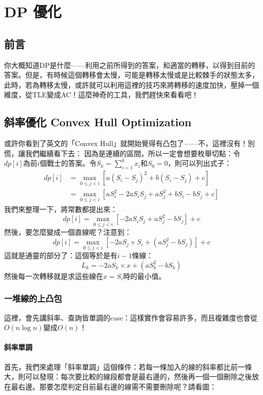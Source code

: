 \chapter{DP 優化}
	\section{前言}
		你大概知道DP是什麼——利用之前所得到的答案，和適當的轉移，以得到目前的答案。但是，有時候這個轉移會太慢，可能是轉移太慢或是比較棘手的狀態太多，此時，若為轉移太慢，或許就可以利用這裡的技巧來將轉移的速度加快，壓掉一個維度，從TLE變成AC！這麼神奇的工具，我們趕快來看看吧！
	\section{斜率優化 Convex Hull Optimization}
		或許你看到了英文的「Convex Hull」就開始覺得有凸包了——不，這裡沒有！別慌，讓我們繼續看下去：
		因為是連續的區間，所以一定會想要枚舉切點：令$dp[i]$為前$i$個戰士的答案。令$S_k = \sum^{k}_{i =1 } x_i$和$S_0 = 0$，則可以列出式子：
		\begin{align*}
			dp[i] &= \max_{0 \leq j < i}[a(S_i - S_{j})^2 + b(S_i - S_{j}) + c]\\
			&= \max_{0 \leq j < i}[aS_i^2 - 2aS_iS_j  + aS_j^2 + bS_i - bS_j + c]
		\end{align*}
		我們來整理一下，將常數都提出來：
		$$dp[i] = \max_{0 \leq j < i}[ - 2aS_iS_j  + aS_j^2  - bS_j] + c$$
		然後，要怎麼變成一個直線呢？注意到：
		$$dp[i] = \max_{0 \leq j < i}[ - 2aS_j \times S_i  + (aS_j^2  - bS_j)] + c$$
		這就是通靈的部分了：這個等於是有$i - 1$條線：
		$$L_k = -2aS_k\times x + (aS_k^2 - bS_k)$$
		然後每一次轉移就是求這些線在$x = S_i$時的最小值。
	\subsection{一堆線的上凸包}
		這裡，會先講斜率、查詢皆單調的case：這樣實作會容易許多，而且複雜度也會從$O(n \log n)$變成$O(n)$！
		\subsubsection{斜率單調}
			首先，我們來處理「斜率單調」這個條件：若每一條加入的線的斜率都比前一條大，則可以發現：每次要比較的線段都會是最右邊的，然後再一個一個刪除之後放在最右邊。那要怎麼判定目前最右邊的線需不需要刪除呢？請看圖：
			
